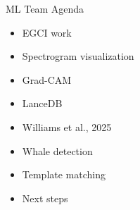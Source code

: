 




\begin{frame}{ML Team Agenda}
    \begin{itemize}
        \item EGCI work
        \item Spectrogram visualization
        \item Grad-CAM
        \item LanceDB
        \item Williams et al., 2025
        \item Whale detection
        \item Template matching
        \item Next steps
    \end{itemize}
\end{frame}

